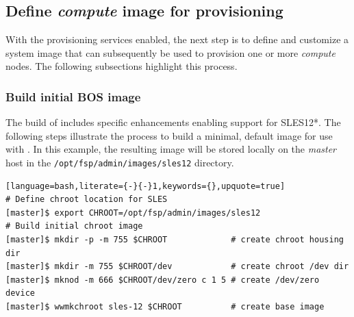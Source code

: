 \documentclass[letterpaper]{article}
\newcommand{\baseOS}{SLES12*}
\begin{document}




\subsection{Define {\em compute} image for provisioning}

With the provisioning services enabled, the next step is to define and
customize a system image that can subsequently be used to provision one or more
{\em compute} nodes. The following subsections highlight this process.

\subsubsection{Build initial BOS image}

The \FSP{} build of \Warewulf{} includes specific enhancements enabling support for
\baseOS{}. The following steps illustrate the process to build a minimal, default
image for use with \Warewulf{}. In this example, the resulting image will be
stored locally on the {\em master} host in the
\texttt{/opt/fsp/admin/images/sles12} directory.

\begin{lstlisting}[language=bash,literate={-}{-}1,keywords={},upquote=true]
# Define chroot location for SLES 
[master]$ export CHROOT=/opt/fsp/admin/images/sles12
# Build initial chroot image
[master]$ mkdir -p -m 755 $CHROOT             # create chroot housing dir
[master]$ mkdir -m 755 $CHROOT/dev            # create chroot /dev dir
[master]$ mknod -m 666 $CHROOT/dev/zero c 1 5 # create /dev/zero device
[master]$ wwmkchroot sles-12 $CHROOT          # create base image
\end{lstlisting}
\end{document}
